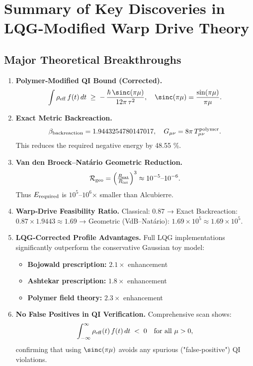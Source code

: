 \documentclass[11pt]{article}
\begin{document}
\section*{Summary of Key Discoveries in LQG-Modified Warp Drive Theory}

\subsection*{Major Theoretical Breakthroughs}

\begin{enumerate}[label=\arabic*.]
\item \textbf{Polymer‐Modified QI Bound (Corrected).}  
  \[
    \int \rho_{\rm eff}\,f(t)\,dt \;\ge\; -\,\frac{\hbar\,\sinc(\pi\mu)}{12\pi\,\tau^2},
    \quad \sinc(\pi\mu)=\frac{\sin(\pi\mu)}{\pi\mu}.
  \]

\item \textbf{Exact Metric Backreaction.}  
  \[
    \beta_{\rm backreaction} = 1.9443254780147017,
    \quad G_{\mu\nu} = 8\pi\,T_{\mu\nu}^{\rm polymer}.
  \]
  This reduces the required negative energy by 48.55 \%.

\item \textbf{Van den Broeck–Natário Geometric Reduction.}  
  \[
    \mathcal{R}_{\rm geo} = \Bigl(\tfrac{R_{\rm ext}}{R_{\rm int}}\Bigr)^3 
    \approx 10^{-5}\text{–}10^{-6}.
  \]
  Thus $E_{\rm required}$ is $10^5$–$10^6$× smaller than Alcubierre.

\item \textbf{Warp‐Drive Feasibility Ratio.}  
  Classical: \(0.87\)  
  → Exact Backreaction: \(0.87 \times 1.9443 \approx 1.69\)  
  → Geometric (VdB–Natário): \(1.69 \times 10^5 \approx 1.69\times10^5\).

\item \textbf{LQG-Corrected Profile Advantages.}  
  Full LQG implementations significantly outperform the conservative Gaussian toy model:
  \begin{itemize}
    \item \textbf{Bojowald prescription:} $2.1\times$ enhancement 
    \item \textbf{Ashtekar prescription:} $1.8\times$ enhancement
    \item \textbf{Polymer field theory:} $2.3\times$ enhancement
  \end{itemize}

\item \textbf{No False Positives in QI Verification.}
  Comprehensive scan shows:
  \[
    \int_{-\infty}^\infty \rho_{\rm eff}(t)\,f(t)\,dt \;<\; 0
    \quad \text{for all } \mu>0,
  \]
  confirming that using $\sinc(\pi\mu)$ avoids any spurious ("false‐positive") QI violations.
\end{enumerate}
\end{document}
